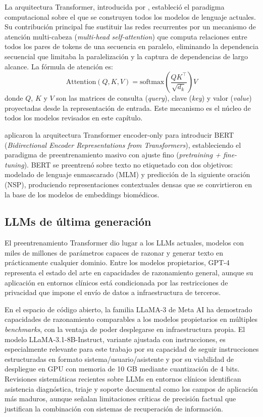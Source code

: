 \documentclass[11pt,a4paper,spanish]{book}
\numberwithin{equation}{chapter}
\numberwithin{figure}{chapter}
\begin{document}
La arquitectura Transformer, introducida por , estableció el paradigma computacional sobre el que se construyen todos los modelos de lenguaje actuales. Su contribución principal fue sustituir las redes recurrentes por un mecanismo de atención multi-cabeza (\textit{multi-head self-attention}) que computa relaciones entre todos los pares de tokens de una secuencia en paralelo, eliminando la dependencia secuencial que limitaba la paralelización y la captura de dependencias de largo alcance. La fórmula de atención es:
\begin{equation}
  \text{Attention}(Q, K, V) = \text{softmax}\!\left(\frac{QK^{\top}}{\sqrt{d_k}}\right)V
\end{equation}
donde $Q$, $K$ y $V$ son las matrices de consulta (\textit{query}), clave (\textit{key}) y valor (\textit{value}) proyectadas desde la representación de entrada. Este mecanismo es el núcleo de todos los modelos revisados en este capítulo.

 aplicaron la arquitectura Transformer encoder-only para introducir BERT (\textit{Bidirectional Encoder Representations from Transformers}), estableciendo el paradigma de preentrenamiento masivo con ajuste fino (\textit{pretraining + fine-tuning}). BERT se preentrenó sobre texto no etiquetado con dos objetivos: modelado de lenguaje enmascarado (MLM) y predicción de la siguiente oración (NSP), produciendo representaciones contextuales densas que se convirtieron en la base de los modelos de embeddings biomédicos.

\subsection{LLMs de última generación}

El preentrenamiento Transformer dio lugar a los LLMs actuales, modelos con miles de millones de parámetros capaces de razonar y generar texto en prácticamente cualquier dominio. Entre los modelos propietarios, GPT-4 \cite{openai_gpt-4_2024} representa el estado del arte en capacidades de razonamiento general, aunque su aplicación en entornos clínicos está condicionada por las restricciones de privacidad que impone el envío de datos a infraestructura de terceros.

En el espacio de código abierto, la familia LLaMA-3 de Meta AI \cite{grattafiori2024llama3herdmodels} ha demostrado capacidades de razonamiento comparables a los modelos propietarios en múltiples \textit{benchmarks}, con la ventaja de poder desplegarse en infraestructura propia. El modelo LLaMA-3.1-8B-Instruct, variante ajustada con instrucciones, es especialmente relevante para este trabajo por su capacidad de seguir instrucciones estructuradas en formato sistema/usuario/asistente y por su viabilidad de despliegue en GPU con memoria de 10 GB mediante cuantización de 4 bits. Revisiones sistemáticas recientes sobre LLMs en entornos clínicos \cite{jcm13113041} identifican asistencia diagnóstica, triaje y soporte documental como los campos de aplicación más maduros, aunque señalan limitaciones críticas de precisión factual que justifican la combinación con sistemas de recuperación de información.
\end{document}
